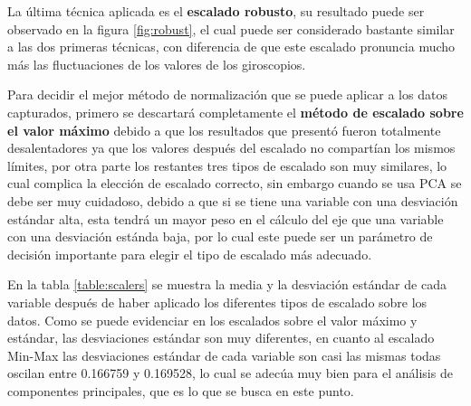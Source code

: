 La \'{u}ltima t\'{e}cnica aplicada es el \textbf{escalado robusto}, su resultado puede ser observado en la figura \ref{fig:robust}, el cual puede ser considerado bastante similar a las dos primeras t\'{e}cnicas, con diferencia de que este escalado pronuncia mucho m\'{a}s las fluctuaciones de los valores de los giroscopios.

\vspace{5mm} %

Para decidir el mejor m\'{e}todo de normalizaci\'{o}n que se puede aplicar a los datos capturados, primero se descartar\'{a} completamente el \textbf{m\'{e}todo de escalado sobre el valor m\'{a}ximo} debido a que los resultados que present\'{o} fueron totalmente desalentadores ya que los valores despu\'{e}s del escalado no compart\'{i}an los mismos l\'{i}mites, por otra parte los restantes tres tipos de escalado son muy similares, lo cual complica la elecci\'{o}n de escalado correcto, sin embargo cuando se usa PCA se debe ser muy cuidadoso, debido a que si se tiene una variable con una desviaci\'{o}n est\'{a}ndar alta, esta tendr\'{a} un mayor peso en el c\'{a}lculo del eje que una variable con una desviaci\'{o}n est\'{a}nda baja, por lo cual este puede ser un par\'{a}metro de decisi\'{o}n importante para elegir el tipo de escalado m\'{a}s adecuado.

\vspace{5mm} %

En la tabla \ref{table:scalers} se muestra la media y la desviaci\'{o}n est\'{a}ndar de cada variable despu\'{e}s de haber aplicado los diferentes tipos de escalado sobre los datos. Como se puede evidenciar en los escalados sobre el valor m\'{a}ximo y est\'{a}ndar, las desviaciones est\'{a}ndar son muy diferentes, en cuanto al escalado Min-Max las desviaciones est\'{a}ndar de cada variable son casi las mismas todas oscilan entre 0.166759	 y 0.169528, lo cual se adec\'{u}a muy bien para el an\'{a}lisis de componentes principales, que es lo que se busca en este punto.


